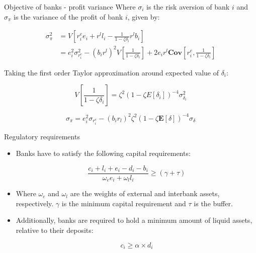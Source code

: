 \documentclass{beamer}
\begin{document}
\begin{frame}{Objective of banks - profit variance}
    Where $\sigma_i$ is the risk aversion of bank $i$ and $\sigma_\pi$ is the variance of the profit of bank $i$, given by:
        
    \begin{equation}
        \begin{aligned}
          \sigma^2_\pi &= V[r^e_i e_i + r^l l_i - \frac{1}{1 - \zeta \delta_i} r^l b_i] \\
          &= e_i^2 \sigma^2_{r^e_i} - (b_i r^l)^2 V[\frac{1}{1 - \zeta \delta_i}] + 2 e_i r^l \textbf{Cov}[r^e_i, \frac{1}{1 - \zeta \delta_i}]
        \end{aligned}\nonumber
      \end{equation}
      
      Taking the first order Taylor approximation around expected value of $\delta_i$:
      
      \[V[\frac{1}{1 - \zeta \delta_i}] = \zeta^2 (1 - \zeta E[\delta_i])^{-4} \sigma^2_{\delta_i}\]

      \[\sigma_\pi = e_i^2 \sigma_{r_i^e} - (b_i  r_l)^2  \zeta^2 (1 - \zeta \mathbf{E}[\delta])^{-4}  \sigma_\delta\]
      
\end{frame}

\begin{frame}{Regulatory requirements}

    \begin{itemize}
        \item Banks have to satisfy the following capital requirements:
        
        \[\frac{c_i + l_i + e_i - d_i - b_i}{\omega_e e_i + \omega_l l_i} \geq (\gamma + \tau)\]

        \item Where $\omega_e$ and $\omega_l$ are the weights of external and interbank assets, respectively. $\gamma$ is the minimum capital requirement and $\tau$ is the buffer.
        
        \item Additionally, banks are required to hold a minimum amount of liquid assets, relative to their deposits:
        
        \[c_i \geq \alpha \times d_i\]

    \end{itemize}

\end{frame}
\end{document}
